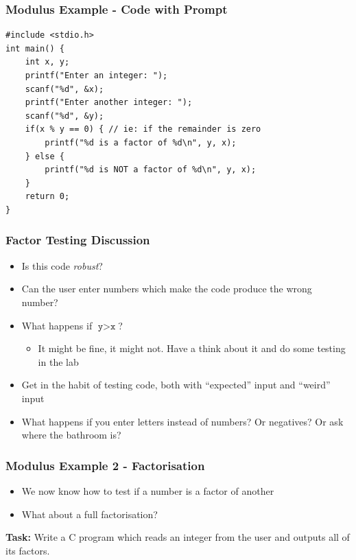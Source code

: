 \documentclass[14pt]{beamer}
\begin{document}
\begin{frame}[fragile]
\frametitle{Modulus Example - Code with Prompt}
\begin{lstlisting}[style=CStyle,caption=\texttt{factorTest.c}]
#include <stdio.h>
int main() {
	int x, y;
	printf("Enter an integer: ");
	scanf("%d", &x);
	printf("Enter another integer: ");
	scanf("%d", &y);
	if(x % y == 0) { // ie: if the remainder is zero
		printf("%d is a factor of %d\n", y, x);
	} else {
		printf("%d is NOT a factor of %d\n", y, x);
	}
	return 0;
}
\end{lstlisting}
\end{frame}

\begin{frame}
\frametitle{Factor Testing Discussion}
\begin{itemize}
\item Is this code \textit{robust}?
\item Can the user enter numbers which make the code produce the wrong number?
\item What happens if $\texttt{y}>\texttt{x}$?
	\begin{itemize}
		\item It might be fine, it might not. Have a think about it and do some testing in the lab
	\end{itemize}
\item Get in the habit of testing code, both with ``expected'' input and ``weird'' input
\item What happens if you enter letters instead of numbers? Or negatives? Or ask where the bathroom is?
\end{itemize}
\end{frame}

\begin{frame}
\frametitle{Modulus Example 2 - Factorisation}
\begin{itemize}
\item We now know how to test if a number is a factor of another
\item What about a full factorisation?
\end{itemize}

\textbf{Task:} Write a C program which reads an integer from the user and outputs all of its factors.
\end{frame}
\end{document}
